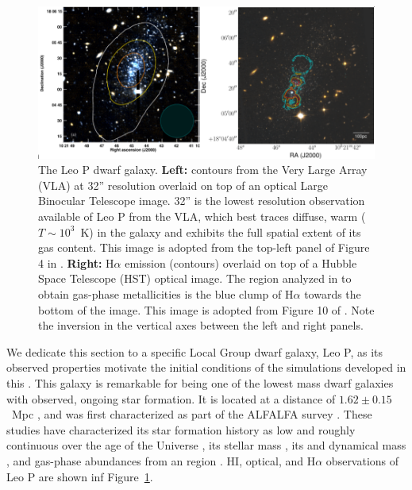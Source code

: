 \begin{figure}
 \centering
 \includegraphics[width=0.975\linewidth]{figures/intro/Leo_P}
 \caption{The Leo P dwarf galaxy. \textbf{Left:} \hi contours from the Very Large Array (VLA) at 32'' resolution overlaid on top of an optical Large Binocular Telescope image. 32'' is the lowest resolution \hi observation available of Leo P from the VLA, which best traces diffuse, warm ($T \sim 10^3$~K) \hi in the galaxy and exhibits the full spatial extent of its gas content. This image is adopted from the top-left panel of Figure 4 in \cite{Bernstein-Cooper2014}. \textbf{Right:} H$\alpha$ emission (contours) overlaid on top of a Hubble Space Telescope (HST) optical image. The \hii region analyzed in \cite{McQuinn2015} to obtain gas-phase metallicities is the blue clump of H$\alpha$ towards the bottom of the image. This image is adopted from Figure 10 of \cite{Evans2019}. Note the inversion in the vertical axes between the left and right panels.}
 \label{intro:fig:Leo P}
\end{figure}

We dedicate this section to a specific Local Group dwarf galaxy, Leo P, as its observed properties motivate the initial conditions of the simulations developed in this \dissertation. This galaxy is remarkable for being one of the lowest mass dwarf galaxies with observed, ongoing star formation. It is located at a distance of $1.62\pm 0.15$~Mpc \citep{McQuinn2015a}, and was first characterized as part of the ALFALFA survey \citep{Giovanelli2013,Rhode2013,Skillman2013,McQuinn2013,Bernstein-Cooper2014}. These studies have characterized its star formation history as low and roughly continuous over the age of the Universe \citep[$<$SFR$>$ = $4.3\times 10^{-5}$~M$_{\odot}$~yr$^{-1}$,][]{McQuinn2015a}, its stellar mass \citep[$M_{*} = 5.7 \times 10^{5}$~M$_{\odot}$,][]{McQuinn2013}, its \hi and dynamical mass \citep[$M_{\rm HI}(r<r_{\rm HI}) = 9.5\times 10^{5}$~M$_{\odot}$, $M_{\rm dyn}(r<r_{\rm HI}) = 2.6 \times 10^{7}$~M$_{\odot}$, $r_{\rm HI} \sim 500$~pc,][]{Bernstein-Cooper2014}, and gas-phase abundances from an \hii region \citep[12 + log(O/H) = 7.17$\pm$0.04][]{Skillman2013}. HI, optical, and H$\alpha$ observations of Leo P are shown inf Figure~\ref{intro:fig:Leo P}.

